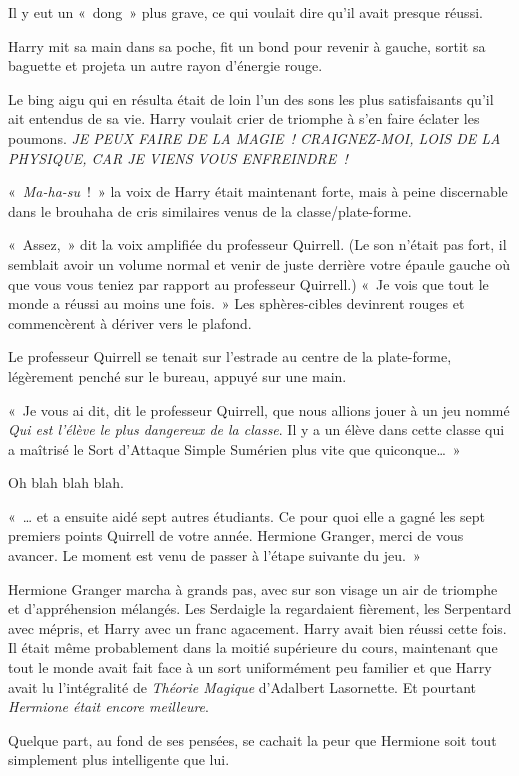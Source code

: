 Il y eut un «~dong~» plus grave, ce qui voulait dire qu'il avait presque réussi.

Harry mit sa main dans sa poche, fit un bond pour revenir à gauche, sortit sa baguette et projeta un autre rayon d'énergie rouge.

Le bing aigu qui en résulta était de loin l'un des sons les plus satisfaisants qu'il ait entendus de sa vie. Harry voulait crier de triomphe à s'en faire éclater les poumons. \emph{JE PEUX FAIRE DE LA MAGIE~! CRAIGNEZ-MOI, LOIS DE LA PHYSIQUE, CAR JE VIENS VOUS ENFREINDRE~!}

«~\emph{Ma-ha-su}~!~» la voix de Harry était maintenant forte, mais à peine discernable dans le brouhaha de cris similaires venus de la classe/plate-forme.

«~Assez,~» dit la voix amplifiée du professeur Quirrell. (Le son n'était pas fort, il semblait avoir un volume normal et venir de juste derrière votre épaule gauche où que vous vous teniez par rapport au professeur Quirrell.) «~Je vois que tout le monde a réussi au moins une fois.~» Les sphères-cibles devinrent rouges et commencèrent à dériver vers le plafond.

Le professeur Quirrell se tenait sur l'estrade au centre de la plate-forme, légèrement penché sur le bureau, appuyé sur une main.

«~Je vous ai dit, dit le professeur Quirrell, que nous allions jouer à un jeu nommé \emph{Qui est l'élève le plus dangereux de la classe}. Il y a un élève dans cette classe qui a maîtrisé le Sort d'Attaque Simple Sumérien plus vite que quiconque…~»

Oh blah blah blah.

«~… et a ensuite aidé sept autres étudiants. Ce pour quoi elle a gagné les sept premiers points Quirrell de votre année. Hermione Granger, merci de vous avancer. Le moment est venu de passer à l'étape suivante du jeu.~»

Hermione Granger marcha à grands pas, avec sur son visage un air de triomphe et d'appréhension mélangés. Les Serdaigle la regardaient fièrement, les Serpentard avec mépris, et Harry avec un franc agacement. Harry avait bien réussi cette fois. Il était même probablement dans la moitié supérieure du cours, maintenant que tout le monde avait fait face à un sort uniformément peu familier et que Harry avait lu l'intégralité de \emph{Théorie Magique} d'Adalbert Lasornette. Et pourtant \emph{Hermione était encore meilleure}.

Quelque part, au fond de ses pensées, se cachait la peur que Hermione soit tout simplement plus intelligente que lui.

